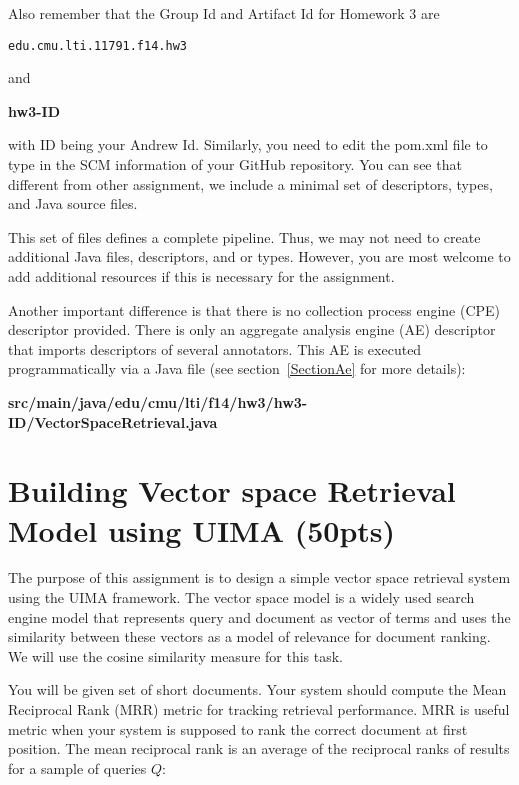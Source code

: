 \documentclass[oneside,11pt]{memoir}
\begin{document}
Also remember that the Group Id and Artifact Id for Homework 3 are

\begin{center}
\texttt{edu.cmu.lti.11791.f14.hw3}
\end{center}

and 

\begin{center}\textbf{hw3-ID }\end{center}
with ID being your Andrew Id.
Similarly, you need to edit the pom.xml file to type in the SCM information of
your GitHub repository. You can see that different from other assignment, 
we include a minimal set of descriptors, types, and Java source files.

This set of files defines a complete pipeline. Thus, we may not need
to create additional Java files, descriptors, and or types.
However, you are most welcome to add additional resources if this is necessary for the assignment.

Another important difference is that there is no collection process engine (CPE) descriptor provided.
There is only an aggregate analysis engine (AE) descriptor that imports descriptors of several annotators.
This AE is executed programmatically via a Java file (see section~\ref{SectionAe} for more details):

\begin{center}\textbf{src/main/java/edu/cmu/lti/f14/hw3/hw3-ID/VectorSpaceRetrieval.java} \end{center}

\chapter{Building Vector space Retrieval Model using UIMA (50pts)}
\label{SectionBuildVS}

The purpose of this assignment is to design a simple vector space retrieval system using the UIMA
framework. 
The vector space model is a widely used search engine model that represents query and
document as vector of terms and uses the similarity between these vectors as a model of relevance for
document ranking. 
We will use the cosine similarity measure for this task. 

You will be given set of short documents. Your system should compute the Mean Reciprocal Rank
(MRR) metric for tracking retrieval performance. MRR is useful metric when your system is supposed
to rank the correct document at first position. The mean reciprocal rank is an average of the reciprocal
ranks of results for a sample of queries $Q$:
\end{document}
